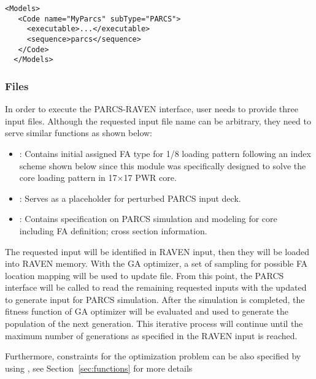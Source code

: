 \begin{lstlisting}[style=XML]
  <Models>
   <Code name="MyParcs" subType="PARCS">
     <executable>...</executable>
     <sequence>parcs</sequence>
   </Code>
  </Models>
  \end{lstlisting}

\subsubsection{Files}
In order to execute the PARCS-RAVEN interface, user needs to provide three input files. 
Although the requested input file name can be arbitrary, they need to serve similar functions as shown below:
\begin{itemize}
	\item {}: Contains initial assigned FA type for 1/8 loading pattern following an index scheme shown below since this module was specifically designed to solve the core loading pattern in 17$\times$17 PWR core. 
	\item {}: Serves as a placeholder for perturbed PARCS input deck.
	\item {}: Contains specification on PARCS simulation and modeling for core including FA definition; cross section information.
\end{itemize}
The requested input will be identified in RAVEN input, then they will be loaded into RAVEN memory.
With the GA optimizer, a set of sampling for possible FA location mapping 
will be used to update  file. From this point, the PARCS interface will be called to
read the remaining requested inputs with the updated  to generate input 
for PARCS simulation. After the simulation is completed, the fitness function of GA 
optimizer will be evaluated and used to generate the population of the next generation. 
This iterative process will continue until the maximum number of generations as specified 
in the RAVEN input is reached.

Furthermore, constraints for the optimization problem can be also specified by using  
, see Section~\ref{sec:functions} for more details

